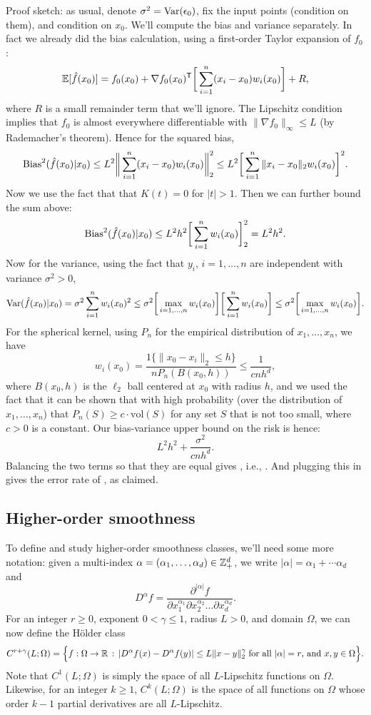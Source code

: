 \documentclass{article}
\begin{document}
Proof sketch: as usual, denote $\sigma^2 = \mathrm{Var}(\epsilon_0)$, fix the input
points (condition on them), and condition on $x_0$. We'll compute the bias and
variance separately. In fact we already did the bias calculation, using a
first-order Taylor expansion of $f_0$: 
\[
\mathbb{E}[\hat{f}(x_0)] = f_0(x_0) + \nabla f_0(x_0)^{\mathsf{T}} \bigg[\sum_{i=1}^n (x_i-x_0)
w_i(x_0) \bigg] + R,  
\]
where $R$ is a small remainder term that we'll ignore. The Lipschitz condition
implies that $f_0$ is almost everywhere differentiable with $\|\nabla
f_0\|_\infty \leq L$ (by Rademacher's theorem). Hence for the squared bias,
\[
\mathrm{Bias}^2(\hat{f}(x_0) | x_0) 
\leq L^2 \bigg\| \sum_{i=1}^n (x_i-x_0) w_i(x_0) \bigg\|_2^2 
\leq L^2 \bigg[ \sum_{i=1}^n \|x_i-x_0\|_2 w_i(x_0) \bigg]^2.
\]
Now we use the fact that that $K(t) = 0$ for $|t| > 1$. Then we can further
bound the sum above: 
\[
\mathrm{Bias}^2(\hat{f}(x_0) | x_0) 
\leq L^2 h^2 \bigg[ \sum_{i=1}^n w_i(x_0) \bigg]_2^2
= L^2 h^2.
\]
Now for the variance, using the fact that $y_i$, $i=1,\dots,n$ are independent
with variance $\sigma^2>0$,
\[
\mathrm{Var}(\hat{f}(x_0) | x_0) 
= \sigma^2 \sum_{i=1}^n w_i(x_0)^2 
\leq \sigma^2 \bigg[ \max_{i=1,\dots,n} w_i(x_0) \bigg] 
\bigg[ \sum_{i=1}^n w_i(x_0) \bigg]  
\leq \sigma^2 \bigg[ \max_{i=1,\dots,n} w_i(x_0) \bigg].
\]
For the spherical kernel, using $P_n$ for the empirical distribution of
$x_1,\dots,x_n$, we have  
\[
w_i(x_0) = \frac{1\{ \|x_0-x_i\|_2 \leq h \}}{n P_n(B(x_0, h)) } \leq
\frac{1}{cnh^d},
\]
where $B(x_0,h)$ is the $\ell_2$ ball centered at $x_0$ with radius $h$, and we
used the fact that it can be shown that with high probability (over the
distribution of $x_1,\dots,x_n$) that $P_n(S) \geq c \cdot \mathrm{vol}(S)$ for
any set $S$ that is not too small, where $c>0$ is a constant. Our bias-variance
upper bound on the risk is hence:
\[
L^2 h^2 + \frac{\sigma^2}{cnh^d}.
\]
Balancing the two terms so that they are equal gives , i.e., . And plugging this in gives
the error rate of , as claimed.   

\subsection{Higher-order smoothness}

To define and study higher-order smoothness classes, we'll need some more
notation: given a multi-index $\alpha=(\alpha_1,\dots,\alpha_d) \in \mathbb{Z}^d_+$, we
write  $|\alpha| = \alpha_1 + \cdots \alpha_d$ and 
\[
D^\alpha f = \frac{\partial^{|\alpha|} f}{\partial x_1^{\alpha_1} \partial
  x_2^{\alpha_2} \dots \partial x_d^{\alpha_d}}.
\]
For an integer $r \geq 0$, exponent $0 < \gamma \leq 1$, radius $L>0$, and
domain $\Omega$, we can now define the H{\"o}lder class
\[
C^{r+\gamma}(L; \Omega) = \Big\{ f : \Omega \to \mathbb{R} \,:\, | D^\alpha f (x) -
D^\alpha f(y) | \leq L \|x-y\|_2^\gamma \; \text{for all $|\alpha| = r$, and
  $x,y \in \Omega$} \Big\}. 
\]
Note that $C^1(L; \Omega)$ is simply the space of all $L$-Lipschitz functions on
$\Omega$. Likewise, for an integer $k \geq 1$, $C^k(L; \Omega)$ is the space of
all functions on $\Omega$ whose order $k-1$ partial derivatives are all
$L$-Lipschitz. 
\end{document}
